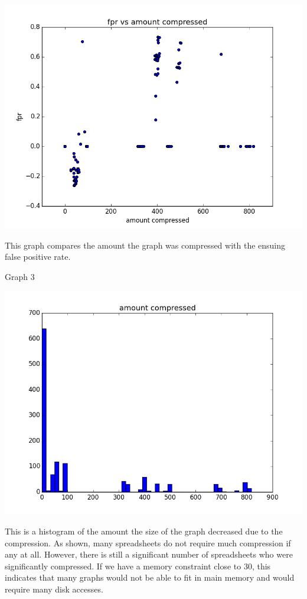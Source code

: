 \documentclass[11pt]{article}
\begin{document}
\includegraphics[width=\textwidth]{fprvamountcomp.png}

This graph compares the amount the graph was compressed with the ensuing false positive rate.

Graph 3

\includegraphics[width=\textwidth]{amountcomp.png}

This is a histogram of the amount the size of the graph decreased due to the compression. As shown, many spreadsheets do not require much compression if any at all. However, there is still a significant number of spreadsheets who were significantly compressed. If we have a memory constraint close to 30, this indicates that many graphs would not be able to fit in main memory and would require many disk accesses.
\end{document}
